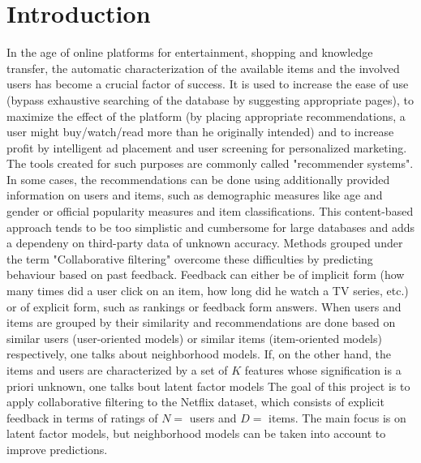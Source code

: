 \section{Introduction}

In the age of online platforms for entertainment, shopping and 
knowledge transfer, the automatic characterization of the available items and
the involved users has become a
crucial factor of success. It is used to increase the ease of use 
(bypass exhaustive searching of the database by suggesting appropriate pages),
to maximize the effect of the platform (by placing appropriate recommendations,
a user might buy/watch/read more than he originally intended) and to increase
profit by intelligent ad placement and user screening for personalized marketing.
The tools created for such purposes are commonly called "recommender
systems".
In some cases, the recommendations can be done using additionally provided
information on users and items, such as demographic measures like age and gender or official
popularity measures and item classifications. This content-based approach tends
to be too simplistic and cumbersome for large databases and adds a dependeny
on third-party data of unknown accuracy.  
Methods grouped under the term "Collaborative filtering" overcome these
difficulties by predicting behaviour based on past feedback. Feedback can either be
of implicit form (how many times did a user click on an item, how long did he
watch a TV series, etc.) or of explicit form, such as rankings or feedback form
answers. \cite{Hu2008} 
When users and items are grouped by their similarity and recommendations are
done based on similar users (user-oriented models) or similar items
(item-oriented models) respectively, one talks about neighborhood models. 
If, on the other hand, the items and users are characterized by a set of $K$ features
whose signification is a priori unknown, one talks bout latent factor models  
The goal of this project is to apply collaborative filtering to the Netflix
dataset, which consists of explicit feedback in terms of ratings of $N=$ users
and $D=$ items. The main focus is on latent factor models, but neighborhood
models can be taken into account to improve predictions.


